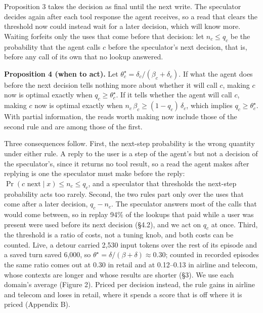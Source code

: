 \documentclass[10pt,twocolumn,letterpaper]{article}
\newcommand{\runin}[1]{{\sffamily\bfseries\color{accent}#1}}
\begin{document}
Proposition 3 takes the decision as final until the next write. The speculator decides again after each tool response the agent receives, so a read that clears the threshold now could instead wait for a later decision, which will know more. Waiting forfeits only the uses that come before that decision: let \(n_c \le q_c\) be the probability that the agent calls \(c\) before the speculator's next decision, that is, before any call of its own that no lookup answered.

\begin{prop}
\runin{Proposition 4 (when to act).} Let \(\theta^\star_c = \delta_c/(\beta_c+\delta_c)\). If what the agent does before the next decision tells nothing more about whether it will call \(c\), making \(c\) now is optimal exactly when \(q_c \ge \theta^\star_c\). If it tells whether the agent will call \(c\), making \(c\) now is optimal exactly when \(n_c\,\beta_c \ge (1-q_c)\,\delta_c\), which implies \(q_c \ge \theta^\star_c\). With partial information, the reads worth making now include those of the second rule and are among those of the first.
\end{prop}

Three consequences follow. First, the next-step probability is the wrong quantity under either rule. A reply to the user is a step of the agent's but not a decision of the speculator's, since it returns no tool result, so a read the agent makes after replying is one the speculator must make before the reply: \(\Pr(c \text{ next} \mid x) \le n_c \le q_c\), and a speculator that thresholds the next-step probability acts too rarely. Second, the two rules part only over the uses that come after a later decision, \(q_c - n_c\). The speculator answers most of the calls that would come between, so in replay 94\% of the lookups that paid while a user was present were used before its next decision (§4.2), and we act on \(q_c\) at once. Third, the threshold is a ratio of costs, not a tuning knob, and both costs can be counted. Live, a detour carried 2,530 input tokens over the rest of its episode and a saved turn saved 6,000, so \(\theta^\star = \delta/(\beta+\delta) \approx 0.30\); counted in recorded episodes the same ratio comes out at 0.30 in retail and at 0.12--0.13 in airline and telecom, whose contexts are longer and whose results are shorter (§3). We use each domain's average (Figure 2). Priced per decision instead, the rule gains in airline and telecom and loses in retail, where it spends a score that is off where it is priced (Appendix B).
\end{document}
